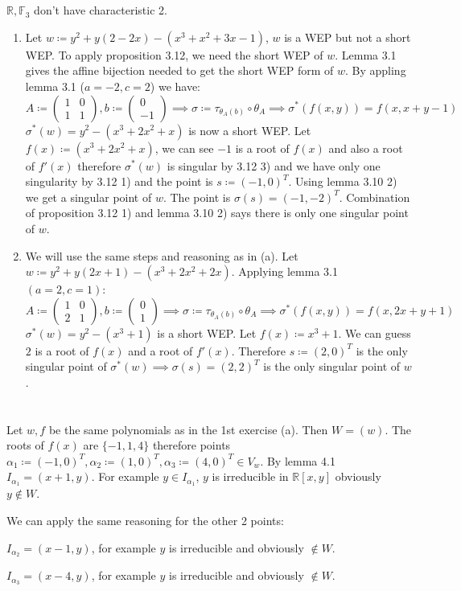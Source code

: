 \documentclass[12pt, a4paper]{article}
\begin{document}
\section{}
$\mathbb{R}, \mathbb{F}_3$ don't have characteristic 2.
\begin{enumerate}[label=(\alph*)]
\item Let $w \coloneqq y^2+y(2−2x)−(x^3+x^2+3x−1)$, $w$ is a WEP but not a short WEP. To apply proposition 3.12, we need the short WEP of $w$. Lemma 3.1 gives the affine bijection needed to get the short WEP form of $w$. By appling lemma 3.1 ($a = -2, c = 2$) we have: 
\[
A \coloneqq \begin{pmatrix}
1 & 0 \\
1 & 1
\end{pmatrix}, b \coloneqq \begin{pmatrix}
0 \\
-1
\end{pmatrix} \implies \sigma \coloneqq \tau_{\theta_A(b)} \circ \theta_A \implies \sigma^*(f(x,y)) = f(x, x+y-1)
\]
$\sigma^*(w) = y^2-(x^3+2x^2+x)$ is now a short WEP. Let $f(x)\coloneqq (x^3+2x^2+x)$, we can see $-1$ is a root of $f(x)$ and also a root of $f'(x)$ therefore $\sigma^*(w)$ is singular by 3.12 3) and we have only one singularity by 3.12 1) and the point is $s \coloneqq (-1,0)^T$.
Using lemma 3.10 2) we get a singular point of $w$. The point is $\sigma(s) = (-1,-2)^T$. Combination of proposition 3.12 1) and lemma 3.10 2) says there is only one singular point of $w$.

\item We will use the same steps and reasoning as in (a). Let $w \coloneqq y^2 + y(2x+1)-(x^3+2x^2+2x)$. Applying lemma 3.1 $(a=2, c=1)$:
\[
A \coloneqq \begin{pmatrix}
1 & 0 \\
2 & 1
\end{pmatrix}, b \coloneqq \begin{pmatrix}
0 \\
1
\end{pmatrix} \implies \sigma \coloneqq \tau_{\theta_A(b)} \circ \theta_A \implies \sigma^*(f(x,y)) = f(x, 2x+y+1)
\]
$\sigma^*(w) = y^2-(x^3+1)$ is a short WEP. Let $f(x) \coloneqq x^3+1$. We can guess $2$ is a root of $f(x)$ and a root of $f'(x)$. Therefore $s\coloneqq (2,0)^T$ is the only singular point of $\sigma^*(w) \implies \sigma(s) = (2,2)^T$ is the only singular point of $w$. 
\end{enumerate}

\section{}
Let $w,f$ be the same polynomials as in the 1st exercise (a). Then $W = (w)$. The roots of $f(x)$ are $\{-1,1,4\}$ therefore points $\alpha_1 \coloneqq (-1,0)^T, \alpha_2 \coloneqq (1,0)^T, \alpha_3 \coloneqq (4,0)^T \in V_w$. By lemma 4.1 $I_{\alpha_1} = (x+1,y)$. For example $y \in I_{\alpha_1}$, $y$ is irreducible in $\mathbb{R}[x,y]$ obviously $y \notin W$.

We can apply the same reasoning for the other 2 points: 

$I_{\alpha_2} = (x-1,y)$, for example $y$ is irreducible and obviously $\notin W$. 

$I_{\alpha_3} = (x-4,y)$, for example $y$ is irreducible and obviously $\notin W$.
\end{document}
